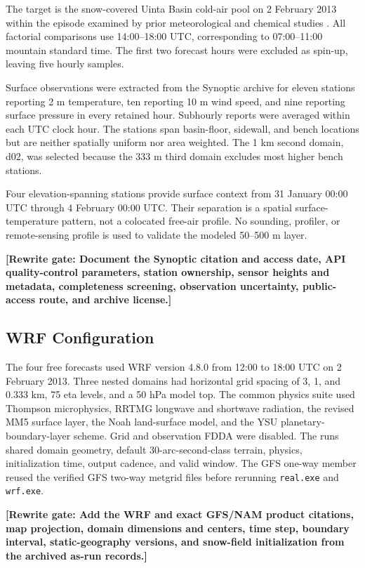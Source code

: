 \documentclass[air,article,submit,moreauthors]{Definitions/mdpi}
\newcommand{\rewritegate}[1]{\textbf{[Rewrite gate: #1]}}
\begin{document}
The target is the snow-covered Uinta Basin cold-air pool on 2 February 2013 within the episode examined by prior meteorological and chemical studies \citep{Neemann2015-ws,Ahmadov2015-zm}.
All factorial comparisons use 14:00--18:00 UTC, corresponding to 07:00--11:00 mountain standard time.
The first two forecast hours were excluded as spin-up, leaving five hourly samples.

Surface observations were extracted from the Synoptic archive for eleven stations reporting 2 m temperature, ten reporting 10 m wind speed, and nine reporting surface pressure in every retained hour.
Subhourly reports were averaged within each UTC clock hour.
The stations span basin-floor, sidewall, and bench locations but are neither spatially uniform nor area weighted.
The 1 km second domain, d02, was selected because the 333 m third domain excludes most higher bench stations.

Four elevation-spanning stations provide surface context from 31 January 00:00 UTC through 4 February 00:00 UTC.
Their separation is a spatial surface-temperature pattern, not a colocated free-air profile.
No sounding, profiler, or remote-sensing profile is used to validate the modeled 50--500 m layer.

\rewritegate{Document the Synoptic citation and access date, API quality-control parameters, station ownership, sensor heights and metadata, completeness screening, observation uncertainty, public-access route, and archive license.}

\subsection{WRF Configuration}

The four free forecasts used WRF version 4.8.0 from 12:00 to 18:00 UTC on 2 February 2013.
Three nested domains had horizontal grid spacing of 3, 1, and 0.333 km, 75 eta levels, and a 50 hPa model top.
The common physics suite used Thompson microphysics, RRTMG longwave and shortwave radiation, the revised MM5 surface layer, the Noah land-surface model, and the YSU planetary-boundary-layer scheme.
Grid and observation FDDA were disabled.
The runs shared domain geometry, default 30-arc-second-class terrain, physics, initialization time, output cadence, and valid window.
The GFS one-way member reused the verified GFS two-way metgrid files before rerunning \texttt{real.exe} and \texttt{wrf.exe}.

\rewritegate{Add the WRF and exact GFS/NAM product citations, map projection, domain dimensions and centers, time step, boundary interval, static-geography versions, and snow-field initialization from the archived as-run records.}
\end{document}
